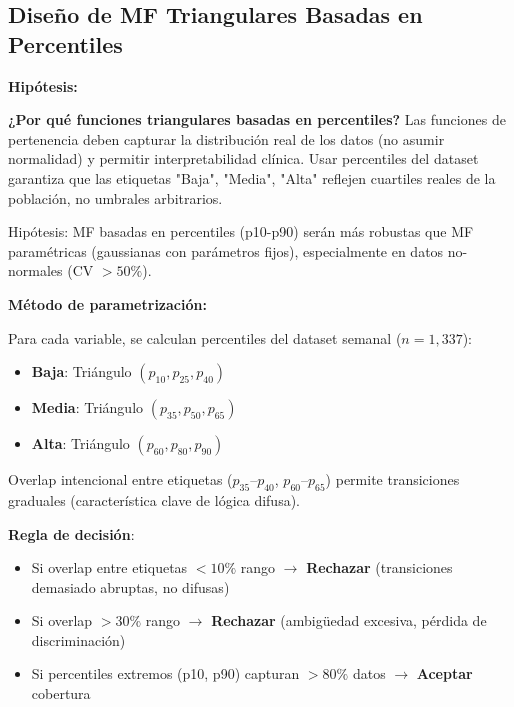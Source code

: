 \documentclass[12pt,letterpaper,twoside]{report}
\begin{document}
\subsection{Diseño de MF Triangulares Basadas en Percentiles}

\begin{hipotesisbox}
\textbf{Hipótesis:}

\textbf{¿Por qué funciones triangulares basadas en percentiles?} Las funciones de pertenencia deben capturar la distribución real de los datos (no asumir normalidad) y permitir interpretabilidad clínica. Usar percentiles del dataset garantiza que las etiquetas "Baja", "Media", "Alta" reflejen cuartiles reales de la población, no umbrales arbitrarios.

Hipótesis: MF basadas en percentiles (p10-p90) serán más robustas que MF paramétricas (gaussianas con parámetros fijos), especialmente en datos no-normales (CV $> 50\%$).
\end{hipotesisbox}

\begin{estadisticobox}
\textbf{Método de parametrización:}

Para cada variable, se calculan percentiles del dataset semanal ($n=1,337$):
\begin{itemize}[noitemsep]
    \item \textbf{Baja}: Triángulo $(p_{10}, p_{25}, p_{40})$
    \item \textbf{Media}: Triángulo $(p_{35}, p_{50}, p_{65})$
    \item \textbf{Alta}: Triángulo $(p_{60}, p_{80}, p_{90})$
\end{itemize}

Overlap intencional entre etiquetas ($p_{35}$--$p_{40}$, $p_{60}$--$p_{65}$) permite transiciones graduales (característica clave de lógica difusa).
\end{estadisticobox}

\begin{reglabox}
\textbf{Regla de decisión}:

\begin{itemize}[noitemsep]
    \item Si overlap entre etiquetas $< 10\%$ rango $\to$ \textbf{Rechazar} (transiciones demasiado abruptas, no difusas)
    \item Si overlap $> 30\%$ rango $\to$ \textbf{Rechazar} (ambigüedad excesiva, pérdida de discriminación)
    \item Si percentiles extremos (p10, p90) capturan $> 80\%$ datos $\to$ \textbf{Aceptar} cobertura
\end{itemize}
\end{reglabox}
\end{document}
